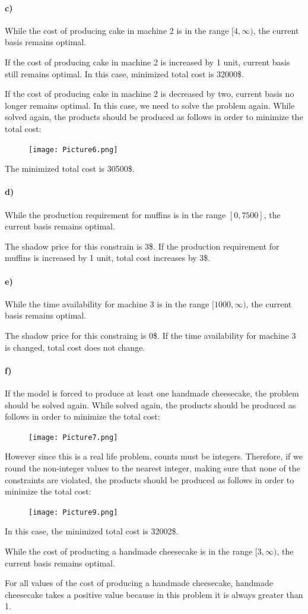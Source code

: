 \documentclass{article}
\begin{document}
\paragraph*{c)}
While the cost of producing cake in machine 2 is in the range $[4, \infty)$, the current basis remains optimal.

If the cost of producing cake in machine 2 is increased by 1 unit, current basis still remains optimal. In this case, minimized total cost is 32000\$.

If the cost of producing cake in machine 2 is decreased by two, current basis no longer remains optimal. In this case, we need to solve the problem again.
While solved again, the products should be produced as follows in order to minimize the total cost:
\begin{figure}[H]
    \texttt{[image: Picture6.png]}
\end{figure}
The minimized total cost is 30500\$.

\paragraph*{d)}
While the production requirement for muffins is in the range $[0, 7500]$, the current basis remains optimal.

The shadow price for this constrain is 3\$.
If the production requirement for muffins is increased by 1 unit, total cost increases by 3\$.

\paragraph*{e)}
While the time availability for machine 3 is in the range $[1000, \infty)$, the current basis remains optimal.

The shadow price for this constraing is 0\$.
If the time availability for machine 3 is changed, total cost does not change.

\paragraph*{f)}
If the model is forced to produce at least one handmade cheesecake, the problem should be solved again.
While solved again, the products should be produced as follows in order to minimize the total cost:
\begin{figure}[H]
    \texttt{[image: Picture7.png]}
\end{figure}
However since this is a real life problem, counts must be integers. Therefore, if we round the non-integer values to the nearest integer, making sure that none of the constraints are violated, the products should be produced as follows in order to minimize the total cost:
\begin{figure}[H]
    \texttt{[image: Picture9.png]}
\end{figure}
In this case, the minimized total cost is 32002\$.

While the cost of producting a handmade cheesecake is in the range $[3, \infty)$, the current basis remains optimal.

For all values of the cost of producing a handmade cheesecake, handmade cheesecake takes a positive value because in this problem it is always greater than 1.
\end{document}
